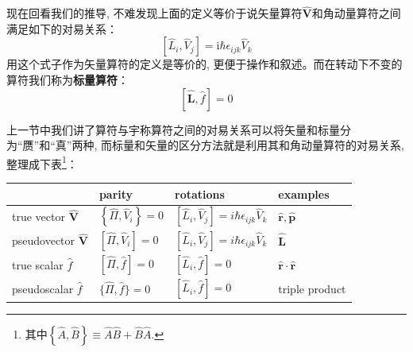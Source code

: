 \documentclass[a4paper,zihao=-4,linespread=1]{ctexrep}
\newenvironment{lequation}{\large\begin{equation}}{\end{equation}}
\begin{document}
    现在回看我们的推导, 不难发现上面的定义等价于说矢量算符$\hat{\mathbf{V}}$和角动量算符之间满足如下的对易关系：
    \begin{lequation}
        \label{eq:6.42}
        \boxed{
            \left[\hat L_i,\hat V_j\right]=\mathrm{i}\hbar\epsilon_{ijk}\hat{V}_k
        }
    \end{lequation}
    用这个式子作为矢量算符的定义是等价的, 更便于操作和叙述。而在转动下不变的算符我们称为\textbf{标量算符}：
    \begin{lequation}
        \boxed{
            \left[\hat{\mathbf L},\hat f\right]=0
        }
    \end{lequation}

    上一节中我们讲了算符与宇称算符之间的对易关系可以将矢量和标量分为“赝”和“真”两种, 而标量和矢量的区分方法就是利用其和角动量算符的对易关系, 整理成下表\footnote{其中$\left\{\hat A,\hat B\right\}\equiv\hat A\hat B+\hat B\hat A$.}：
    \begin{center}
        \begin{tabular}{llll}
            \hline \hline & parity & rotations & examples \\
            \hline true vector $\hat{\mathbf{V}}$ & $\left\{\hat{\Pi}, \hat{V}_{i}\right\}=0$ & {$\left[\hat{L}_{i}, \hat{V}_{j}\right]=i \hbar \epsilon_{i j k} \hat{V}_{k}$} & $\hat{\mathbf{r}}, \hat{\mathbf{p}}$ \\
            pseudovector $\hat{\mathbf{V}}$ & {$\left[\hat{\Pi}, \hat{V}_{i}\right]=0$} & {$\left[\hat{L}_{i}, \hat{V}_{j}\right]=i \hbar \epsilon_{i j k} \hat{V}_{k}$} & $\hat{\mathbf{L}}$ \\
            true scalar $\hat{f}$ & {$[\hat{\Pi}, \hat{f}]=0$} & {$\left[\hat{L}_{i}, \hat{f}\right]=0$} & $\hat{\mathbf{r}} \cdot \hat{\mathbf{r}}$ \\
            pseudoscalar $\hat{f}$ & $\{\hat{\Pi}, \hat{f}\}=0$ & {$\left[\hat{L}_{i}, \hat{f}\right]=0$} & triple product\\
            \hline \hline
        \end{tabular}
    \end{center}
    
\end{document}

